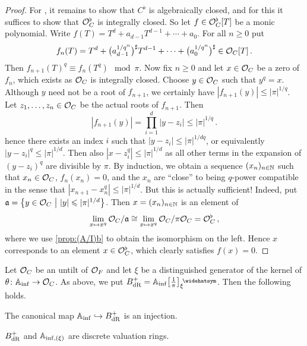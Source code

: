 \begin{proof}
	
	For , it remains to show that $C^\flat$ is algebraically closed, and for this it suffices to show that $\mathcal{O}_C^\flat$ is integrally closed. So let $f\in \mathcal{O}_C^\flat[T]$ be a monic polynomial. Write $f(T)=T^d+a_{d-1}T^{d-1}+\dotsb+a_0$. For all $n\geq 0$ put
	\begin{equation*}
		f_n(T)=T^d+\big(a_{d-1}^{1/q^n}\big)^\sharp T^{d-1}+\dotsb+\big(a_0^{1/q^n}\big)^\sharp\in \mathcal{O}_C[T]\,.
	\end{equation*}
	Then $f_{n+1}(T)^q\equiv f_n(T^q)\mod \pi$. Now fix $n\geq 0$ and let $x\in \mathcal{O}_C$ be a zero of $f_n$, which exists as $\mathcal{O}_C$ is integrally closed. Choose $y\in \mathcal{O}_C$ such that $y^q=x$. Although $y$ need not be a root of $f_{n+1}$, we certainly have $|f_{n+1}(y)|\leq |\pi|^{1/q}$. Let $z_1,\dotsc,z_n\in \mathcal{O}_C$ be the actual roots of $f_{n+1}$. Then
	\begin{equation*}
		|f_{n+1}(y)|=\prod_{i=1}^d|y-z_i|\leq |\pi|^{1/q}\,.
	\end{equation*}
	hence there exists an index $i$ such that $|y-z_i|\leq |\pi|^{1/dq}$, or equivalently $|y-z_i|^q\leq |\pi|^{1/d}$. Then also $|x-z_i^q|\leq |\pi|^{1/d}$ as all other terms in the expansion of $(y-z_i)^q$ are divisible by $\pi$. By induction, we obtain a sequence $(x_n)_{n\in \mathbb{N}}$ such that $x_n\in\mathcal{O}_C$, $f_n(x_n)=0$, and the $x_n$ are \enquote{close} to being $q$-power compatible in the sense that $|x_{n+1}-x_n^q|\leq |\pi|^{1/d}$. But this is actually sufficient! Indeed, put $\mathfrak{a}=\left\{y\in \mathcal{O}_C\ \middle|\  |y|\leqslant |\pi|^{1/d}\right\}$. Then $x=(x_n)_{n\in\mathbb{N}}$ is an element of
	\begin{equation*}
		\lim_{x\mapsto x^q}\mathcal{O}_C/\mathfrak{a}\cong \lim_{x\mapsto x^q}\mathcal{O}_C/\pi\mathcal{O}_C=\mathcal{O}_C^\flat\,,
	\end{equation*}
	where we use \cref{prop:(A/I)b} to obtain the isomorphism on the left. Hence $x$ corresponds to an element $x\in \mathcal{O}_C^\flat$, which clearly satisfies $f(x)=0$.
\end{proof}
\begin{lem}\label{lem:BdR+DVR}
	Let $\mathcal{O}_C$ be an untilt of $\mathcal{O}_F$ and let $\xi$ be a distinguished generator of the kernel of $\theta\colon \IA_\inf\morphism\Oo_C$. As above, we put $B_\dR^+=\IA_\inf\localize{\pi}_\xi^\complete$. Then the following holds.
	\begin{numerate}
		\item The canonical map $\IA_\inf\monomorphism B_\dR^+$ is an injection.
		\item $B_{\mathrm{dR}}^+$ and $\mathbb{A}_{\mathrm{inf},(\xi)}$ are discrete valuation rings.
	\end{numerate}
\end{lem}
